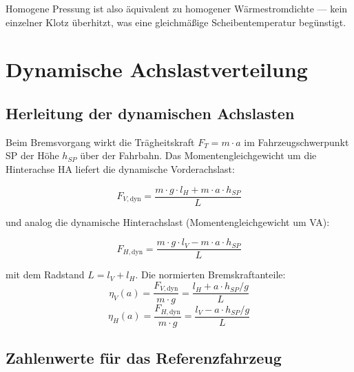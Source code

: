 ﻿\documentclass[12pt,a4paper]{article}
\theoremstyle{definition}
\begin{document}
Homogene Pressung ist also äquivalent zu homogener Wärmestromdichte ---
kein einzelner Klotz überhitzt, was eine gleichmäßige Scheibentemperatur
begünstigt.

\section{Dynamische Achslastverteilung}

\subsection{Herleitung der dynamischen Achslasten}

Beim Bremsvorgang wirkt die Trägheitskraft $F_T = m \cdot a$ im
Fahrzeugschwerpunkt SP der Höhe $h_{SP}$ über der Fahrbahn. 
Das Momentengleichgewicht um die Hinterachse HA liefert die
dynamische Vorderachslast:

\begin{equation}
  F_{V,\text{dyn}} = \frac{m \cdot g \cdot l_H + m \cdot a \cdot h_{SP}}{L}
  \label{eq:F_V_dyn}
\end{equation}

und analog die dynamische Hinterachslast (Momentengleichgewicht um VA):

\begin{equation}
  F_{H,\text{dyn}} = \frac{m \cdot g \cdot l_V - m \cdot a \cdot h_{SP}}{L}
  \label{eq:F_H_dyn}
\end{equation}

mit dem Radstand $L = l_V + l_H$.  Die normierten Bremskraftanteile:
\begin{equation}
  \eta_V(a) = \frac{F_{V,\text{dyn}}}{m \cdot g}
            = \frac{l_H + a \cdot h_{SP}/g}{L}
  \label{eq:eta_V}
\end{equation}
\begin{equation}
  \eta_H(a) = \frac{F_{H,\text{dyn}}}{m \cdot g}
            = \frac{l_V - a \cdot h_{SP}/g}{L}
  \label{eq:eta_H}
\end{equation}

\subsection{Zahlenwerte für das Referenzfahrzeug}
\end{document}
